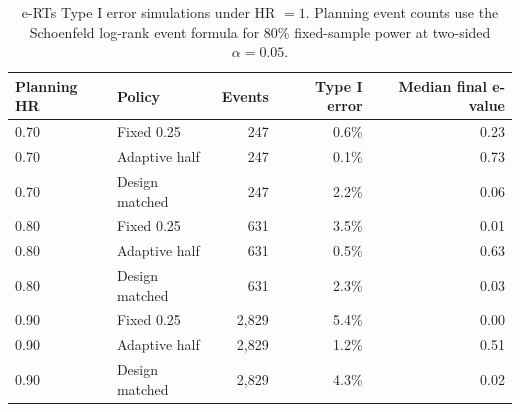 \begin{table}[htbp]
\centering
\caption{e-RTs Type I error simulations under HR $=1$. Planning event counts use the Schoenfeld log-rank event formula for 80\% fixed-sample power at two-sided $\alpha=0.05$.}
\label{tab:erts_wager_policy_type1}
\small
\begin{tabular}{@{}llrrr@{}}
\toprule
Planning HR & Policy & Events & Type I error & Median final e-value \\
\midrule
0.70 & Fixed 0.25 & 247 & 0.6\% & 0.23 \\
0.70 & Adaptive half & 247 & 0.1\% & 0.73 \\
0.70 & Design matched & 247 & 2.2\% & 0.06 \\
0.80 & Fixed 0.25 & 631 & 3.5\% & 0.01 \\
0.80 & Adaptive half & 631 & 0.5\% & 0.63 \\
0.80 & Design matched & 631 & 2.3\% & 0.03 \\
0.90 & Fixed 0.25 & 2{,}829 & 5.4\% & 0.00 \\
0.90 & Adaptive half & 2{,}829 & 1.2\% & 0.51 \\
0.90 & Design matched & 2{,}829 & 4.3\% & 0.02 \\
\bottomrule
\end{tabular}
\end{table}

